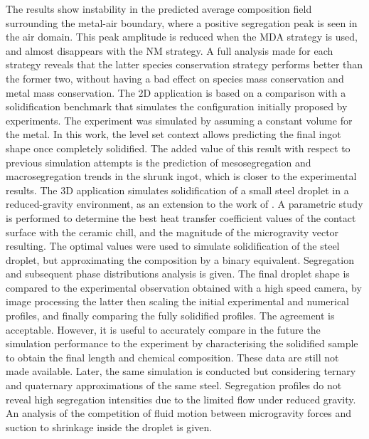 The results show instability in the predicted average composition field surrounding the metal-air boundary, where a positive segregation peak is
seen in the air domain. This peak amplitude is reduced when the MDA strategy is used, and almost disappears with the NM strategy. A full analysis 
made for each strategy reveals that the latter species conservation strategy performs better than the former two, without having a bad effect
on species mass conservation and metal mass conservation.
\newline
The 2D application is based on a comparison with a  solidification benchmark that 
simulates the configuration initially proposed by \citet{hebditch_observations_1974} experiments. The experiment
was simulated by \citet{carozzani_direct_2013} assuming a constant volume for the metal. 
In this work, the level set context allows predicting
the final ingot shape once completely solidified. The added value of this result with respect to previous
simulation attempts is the prediction of mesosegregation and macrosegregation trends in the shrunk ingot, which is closer to the experimental results.
\newline
The 3D application simulates solidification of a small steel droplet in a reduced-gravity environment, as
an extension to the work of \citet{rivaux_simulation_2011}. A parametric study is performed to determine
the best heat transfer coefficient values of the contact surface with the ceramic chill, and the magnitude of the microgravity vector
resulting. The optimal values were used to simulate solidification of the steel droplet, but approximating the composition by a binary equivalent.
Segregation and subsequent phase distributions analysis is given. 
The final droplet shape is compared to the experimental observation obtained with a high speed camera, by
image processing the latter then scaling the initial experimental and numerical profiles, and finally comparing the fully solidified profiles.
The agreement is acceptable. However, it is useful to accurately compare in the future the simulation performance to the experiment by
characterising the solidified sample to obtain the final length and chemical composition. These data are still not made available.  
Later, the same simulation is conducted but considering ternary and quaternary approximations of the same steel. 
Segregation profiles do not reveal high segregation intensities due to the limited flow under
reduced gravity. An analysis of the competition of fluid motion between microgravity forces and suction to shrinkage inside the droplet is given.

